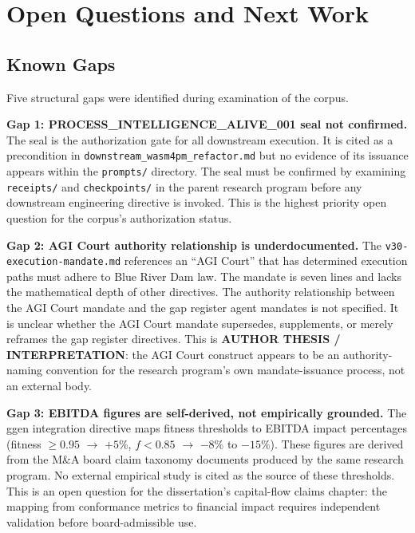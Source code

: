 
\section{Open Questions and Next Work}
\label{sec:prompts-open-questions}

\subsection{Known Gaps}
\label{sec:prompts-open-questions-gaps}

Five structural gaps were identified during examination of the corpus.

\textbf{Gap 1: PROCESS\_INTELLIGENCE\_ALIVE\_001 seal not confirmed.}
The seal is the authorization gate for all downstream execution. It is cited as a
precondition in \texttt{downstream\_wasm4pm\_refactor.md} but no evidence of its
issuance appears within the \texttt{prompts/} directory. The seal must be confirmed
by examining \texttt{receipts/} and \texttt{checkpoints/} in the parent research
program before any downstream engineering directive is invoked. This is the highest
priority open question for the corpus's authorization status.

\textbf{Gap 2: AGI Court authority relationship is underdocumented.}
The \texttt{v30-execution-mandate.md} references an ``AGI Court'' that has determined
execution paths must adhere to Blue River Dam law. The mandate is seven lines and
lacks the mathematical depth of other directives. The authority relationship between
the AGI Court mandate and the gap register agent mandates is not specified. It is
unclear whether the AGI Court mandate supersedes, supplements, or merely reframes the
gap register directives. This is \textbf{AUTHOR THESIS / INTERPRETATION}: the AGI
Court construct appears to be an authority-naming convention for the research program's
own mandate-issuance process, not an external body.

\textbf{Gap 3: EBITDA figures are self-derived, not empirically grounded.}
The ggen integration directive maps fitness thresholds to EBITDA impact percentages
(fitness $\geq 0.95$ $\to$ $+5\%$, $f < 0.85$ $\to$ $-8\%$ to $-15\%$). These
figures are derived from the M\&A board claim taxonomy documents produced by the same
research program. No external empirical study is cited as the source of these
thresholds. This is an open question for the dissertation's capital-flow claims
chapter: the mapping from conformance metrics to financial impact requires independent
validation before board-admissible use.

